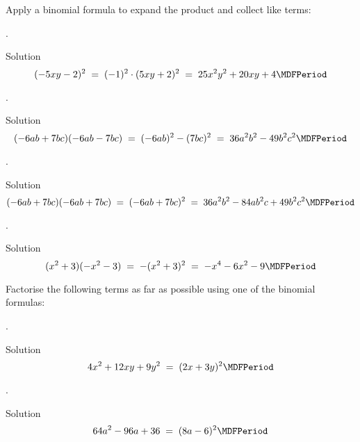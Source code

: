 \begin{MExercises}
\begin{MExercise}
Apply a binomial formula to expand the product and collect like terms:
\begin{MExerciseItems}
\item{. \begin{MHint}{Solution}$$(-5x y-2)^2 \;=\; (-1)^2\cdot(5x y+2)^2 \;=\; 25x^2y^2+20x y+4 \MDFPeriod $$\end{MHint}}
\item{. \begin{MHint}{Solution}$$ (-6a b+7b c)(-6a b-7b c) \;=\; (-6a b)^2-(7b c)^2 \;=\; 36a^2b^2-49b^2c^2 \MDFPeriod $$\end{MHint}}
\item{. \begin{MHint}{Solution}$$ (-6a b+7b c)(-6a b+7b c) \;=\; (-6a b +7b c)^2 \;=\; 36a^2b^2-84a b^2c+49b^2c^2 \MDFPeriod $$\end{MHint}} 
\item{. \begin{MHint}{Solution}$$ (x^2+3)(-x^2-3)\;=\; -(x^2+3)^2\;=\; -x^4-6x^2-9 \MDFPeriod $$\end{MHint}}
\end{MExerciseItems}
\end{MExercise}
\begin{MExercise}
Factorise the following terms as far as possible using one of the binomial formulas:
\begin{MExerciseItems}
\item{. \begin{MHint}{Solution}$$4x^2+12x y+9y^2 \;=\; (2x+3y)^2   \MDFPeriod $$\end{MHint}}
\item{. \begin{MHint}{Solution}$$64a^2-96a+36\;=\;(8a-6)^2   \MDFPeriod $$\end{MHint}}

\end{MExerciseItems}
\end{MExercise}
\end{MExercises}
